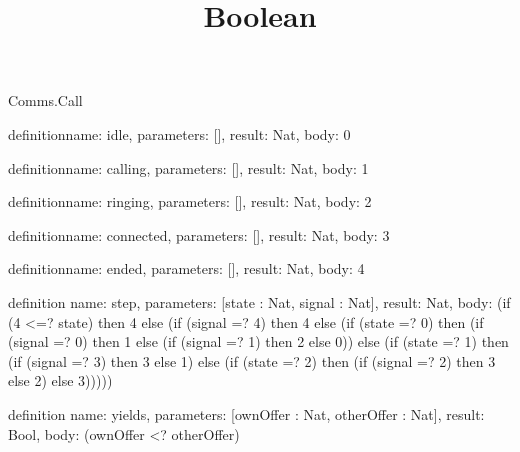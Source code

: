 \begin{lexlean}{Comms.Call}
\title{Boolean}
\begin{semanticmodule}
definition{name: idle, parameters: [], result: Nat, body: 0}

definition{name: calling, parameters: [], result: Nat, body: 1}

definition{name: ringing, parameters: [], result: Nat, body: 2}

definition{name: connected, parameters: [], result: Nat, body: 3}

definition{name: ended, parameters: [], result: Nat, body: 4}

definition{
  name: step,
  parameters: [state : Nat, signal : Nat],
  result: Nat,
  body: (if (4 <=? state) then 4 else (if (signal =? 4) then 4 else (if (state =? 0) then (if (signal =? 0) then 1 else (if (signal =? 1) then 2 else 0)) else (if (state =? 1) then (if (signal =? 3) then 3 else 1) else (if (state =? 2) then (if (signal =? 2) then 3 else 2) else 3)))))
}

definition{
  name: yields,
  parameters: [ownOffer : Nat, otherOffer : Nat],
  result: Bool,
  body: (ownOffer <? otherOffer)
}
\end{semanticmodule}
\end{lexlean}
